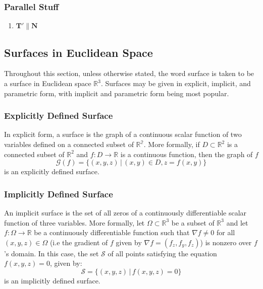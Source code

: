 \documentclass[11pt, a4paper]{article}
\begin{document}
\subsubsection{Parallel Stuff}
\begin{enumerate}
	\item $  \mathbf{T}' \parallel \mathbf{N} $
\end{enumerate}
\fi

\subsection{Surfaces in Euclidean Space}
Throughout this section, unless otherwise stated, the word surface is taken to be a surface in Euclidean space  $ \mathbb{R}^3 $. Surfaces may be given in explicit, implicit, and parametric form, with implicit and parametric form being most popular.

\subsubsection{Explicitly Defined Surface}
In explicit form, a surface is the graph of a continuous scalar function of two variables defined on a connected subset of $ \mathbb{R^2} $. More formally, if $ D \subset \mathbb{R}^2 $ is a connected subset of $  \mathbb{R}^2  $ and $ f : D \rightarrow \mathbb{R} $ is a continuous function, then the graph of $ f $
\begin{equation*}
	\mathcal{G}(f) = \{(x, y, z) \, | \, (x, y) \in D, z = f(x, y) \}
\end{equation*}
is an explicitly defined surface.

\subsubsection{Implicitly Defined Surface}
An implicit surface is the set of all zeros of a continuously differentiable scalar function of three variables. More formally, let $ \Omega \subset \mathbb{R}^3$ be a subset of $ \mathbb{R}^3 $ and let $ f : \Omega \rightarrow \mathbb{R} $ be a continuously differentiable function such that $ \nabla f \neq 0 $ for all $ (x, y, z) \in \Omega $ (i.e the gradient of $ f $ given by $ \nabla f = \left(f_z, f_y, f_z\right) $) is nonzero over $ f $'s domain. In this case, the set $ \mathcal{S} $ of all points satisfying the equation $ f(x, y, z) = 0 $, given by:
\begin{equation*}
	\mathcal{S} = \{(x, y, z) \, | \, f(x, y, z) = 0 \}
\end{equation*}
is an implicitly defined surface.
\end{document}
